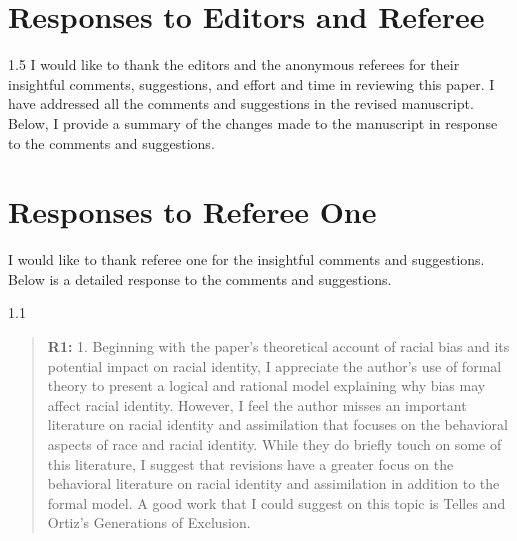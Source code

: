 \documentclass[12pt,english]{article}
\newcommand{\rrquote}{1.1}
\newcommand{\rrxspc}{1.5}
\begin{document}
\begin{refsection}
\setcounter{section}{0}
\renewcommand{\thesection}{\Alph{section}}
\renewcommand{\thesubsection}{\Alph{section}.\arabic{subsection}}
\renewcommand{\thesubsubsection}{\Alph{section}.\arabic{subsection}.\arabic{subsubsection}}

        \section{Responses to Editors and Referee} \label{r&r:responses}
        \begin{spacing}{\rrxspc}
            I would like to thank the editors and the anonymous referees for their insightful comments, suggestions, and effort and time in reviewing this paper. I have addressed all the comments and suggestions in the revised manuscript. Below, I provide a summary of the changes made to the manuscript in response to the comments and suggestions.
        \end{spacing}

    \newpage
    
    \section{Responses to Referee One}
        I would like to thank referee one for the insightful comments and suggestions. Below is a detailed response to the comments and suggestions.
    \begin{spacing}{\rrquote}
    \begin{quotation}
    \textbf{R1: } 1. Beginning with the paper's theoretical account of racial bias and its potential impact on racial identity, I appreciate the author's use of formal theory to present a logical and rational model explaining why bias may affect racial identity. However, I feel the author misses an important literature on racial identity and assimilation that focuses on the behavioral aspects of race and racial identity. While they do briefly touch on some of this literature, I suggest that revisions have a greater focus on the behavioral literature on racial identity and assimilation in addition to the formal model. A good work that I could suggest on this topic is Telles and Ortiz's Generations of Exclusion.
    \end{quotation}
    \end{spacing}
    

\end{refsection}
\end{document}
